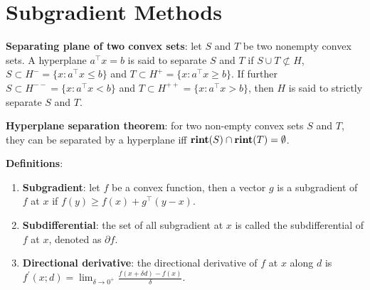 \section{Subgradient Methods}

\textbf{Separating plane of two convex sets}: let $S$ and $T$ be two nonempty convex sets. A hyperplane $a^\top x = b$ is said to separate $S$ and $T$ if $S \cup T \not\subset H$, $S \subset H^-=\{x: a^\top x \le b\}$ and $T \subset H^+ = \{x: a^\top x \ge b\}$. If further $S \subset H^{--}=\{x: a^\top x < b\}$ and $T \subset H^{++} = \{x: a^\top x > b\}$, then $H$ is said to strictly separate $S$ and $T$.

\textbf{Hyperplane separation theorem}: for two non-empty convex sets $S$ and $T$, they can be separated by a hyperplane iff $\operatorname{\textbf{rint}}(S) \cap \operatorname{\textbf{rint}}(T) = \emptyset$.

\textbf{Definitions}:
\begin{enumerate}
    \item \textbf{Subgradient}: let $f$ be a convex function, then a vector $g$ is a subgradient of $f$ at $x$ if $f(y) \ge f(x) + g^\top (y-x)$.
    \item \textbf{Subdifferential}: the set of all subgradient at $x$ is called the subdifferential of $f$ at $x$, denoted as $\partial f$.
    \item \textbf{Directional derivative}: the directional derivative of $f$ at $x$ along $d$ is $f^\prime(x;d) = \lim_{\delta \rightarrow 0^+} \frac{f(x+\delta d) - f(x)}{\delta}$.
\end{enumerate}

